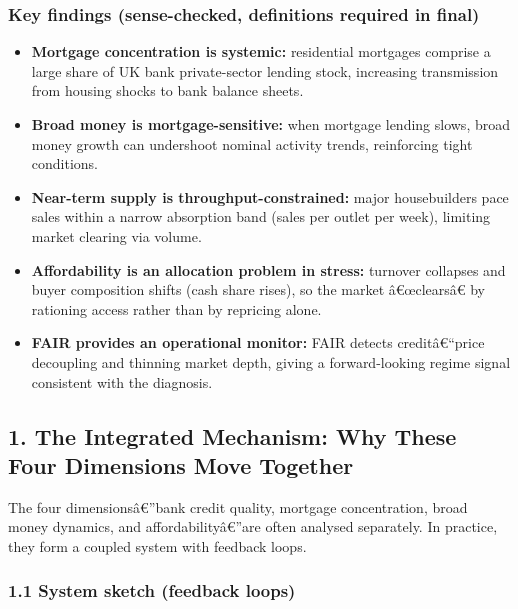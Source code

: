 \subsubsection{Key findings (sense-checked, definitions required in
final)}\label{key-findings-sense-checked-definitions-required-in-final}

\begin{itemize}
\tightlist
\item
  \textbf{Mortgage concentration is systemic:} residential mortgages
  comprise a large share of UK bank private-sector lending stock,
  increasing transmission from housing shocks to bank balance sheets.
\item
  \textbf{Broad money is mortgage-sensitive:} when mortgage lending
  slows, broad money growth can undershoot nominal activity trends,
  reinforcing tight conditions.
\item
  \textbf{Near-term supply is throughput-constrained:} major
  housebuilders pace sales within a narrow absorption band (sales per
  outlet per week), limiting market clearing via volume.
\item
  \textbf{Affordability is an allocation problem in stress:} turnover
  collapses and buyer composition shifts (cash share rises), so the
  market â€œclearsâ€ by rationing access rather than by repricing alone.
\item
  \textbf{FAIR provides an operational monitor:} FAIR detects
  creditâ€``price decoupling and thinning market depth, giving a
  forward-looking regime signal consistent with the diagnosis.
\end{itemize}

\subsection{1. The Integrated Mechanism: Why These Four Dimensions Move
Together}\label{the-integrated-mechanism-why-these-four-dimensions-move-together}

The four dimensionsâ€''bank credit quality, mortgage concentration,
broad money dynamics, and affordabilityâ€''are often analysed
separately. In practice, they form a coupled system with feedback loops.

\subsubsection{1.1 System sketch (feedback
loops)}\label{system-sketch-feedback-loops}

